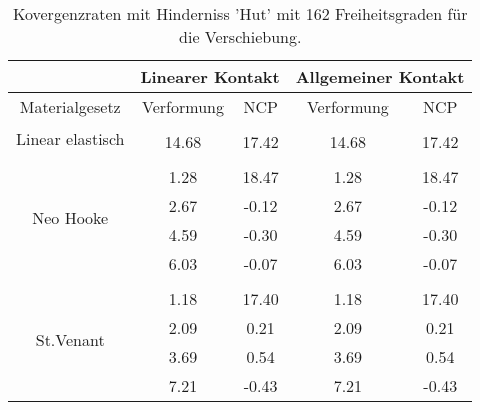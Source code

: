 \begin{table} 
\centering 
\begin{tabular}{c|cc|cc|} 
\cline{2-5} 
 & \multicolumn{2}{|c|}{Linearer Kontakt} & \multicolumn{2}{|c|}{Allgemeiner Kontakt} \\ 
\hline 
\multicolumn{1}{|c|}{Materialgesetz} & \multicolumn{1}{c|}{Verformung} & \multicolumn{1}{c|}{NCP} & \multicolumn{1}{c|}{Verformung} & \multicolumn{1}{c|}{NCP} \\ 
\hline 
\multicolumn{1}{|c|}{\multirow{2}{*}{Linear elastisch}} &\multicolumn{1}{|c|}{} & \multicolumn{1}{|c|}{} & \multicolumn{1}{|c|}{} & \multicolumn{1}{|c|}{} \\ 
\multicolumn{1}{|c|}{} & \multicolumn{1}{|c|}{     14.68} & \multicolumn{1}{|c|}{     17.42} & \multicolumn{1}{|c|}{     14.68} & \multicolumn{1}{|c|}{     17.42} \\ 
\hline 
\multicolumn{1}{|c|}{\multirow{5}{*}{Neo Hooke}} &\multicolumn{1}{|c|}{} & \multicolumn{1}{|c|}{} & \multicolumn{1}{|c|}{} & \multicolumn{1}{|c|}{} \\ 
\multicolumn{1}{|c|}{} & \multicolumn{1}{|c|}{      1.28} & \multicolumn{1}{|c|}{     18.47} & \multicolumn{1}{|c|}{      1.28} & \multicolumn{1}{|c|}{     18.47} \\ 
\multicolumn{1}{|c|}{} & \multicolumn{1}{|c|}{      2.67} & \multicolumn{1}{|c|}{     -0.12} & \multicolumn{1}{|c|}{      2.67} & \multicolumn{1}{|c|}{     -0.12} \\ 
\multicolumn{1}{|c|}{} & \multicolumn{1}{|c|}{      4.59} & \multicolumn{1}{|c|}{     -0.30} & \multicolumn{1}{|c|}{      4.59} & \multicolumn{1}{|c|}{     -0.30} \\ 
\multicolumn{1}{|c|}{} & \multicolumn{1}{|c|}{      6.03} & \multicolumn{1}{|c|}{     -0.07} & \multicolumn{1}{|c|}{      6.03} & \multicolumn{1}{|c|}{     -0.07} \\ 
\hline 
\multicolumn{1}{|c|}{\multirow{5}{*}{St.Venant}} &\multicolumn{1}{|c|}{} & \multicolumn{1}{|c|}{} & \multicolumn{1}{|c|}{} & \multicolumn{1}{|c|}{} \\ 
\multicolumn{1}{|c|}{} & \multicolumn{1}{|c|}{      1.18} & \multicolumn{1}{|c|}{     17.40} & \multicolumn{1}{|c|}{      1.18} & \multicolumn{1}{|c|}{     17.40} \\ 
\multicolumn{1}{|c|}{} & \multicolumn{1}{|c|}{      2.09} & \multicolumn{1}{|c|}{      0.21} & \multicolumn{1}{|c|}{      2.09} & \multicolumn{1}{|c|}{      0.21} \\ 
\multicolumn{1}{|c|}{} & \multicolumn{1}{|c|}{      3.69} & \multicolumn{1}{|c|}{      0.54} & \multicolumn{1}{|c|}{      3.69} & \multicolumn{1}{|c|}{      0.54} \\ 
\multicolumn{1}{|c|}{} & \multicolumn{1}{|c|}{      7.21} & \multicolumn{1}{|c|}{     -0.43} & \multicolumn{1}{|c|}{      7.21} & \multicolumn{1}{|c|}{     -0.43} \\ 
\hline 
\end{tabular}\caption{Kovergenzraten mit Hinderniss 'Hut' mit 162 Freiheitsgraden für die Verschiebung.}\label{tab:Rate_Hut_level2}
\end{table} 

